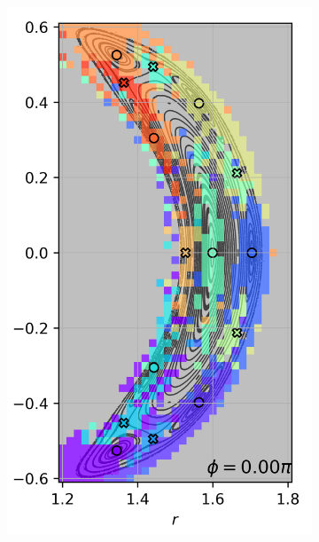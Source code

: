 \begin{figure}
    \centering
    \begin{subfigure}[c]{0.4\textwidth}
        \centering
        \includegraphics[width=\textwidth]{images/fp/convergence_domain_checkonly.png}
        \caption{\label{fig:fp-ncsx}}
    \end{subfigure}
    \hfill
    \begin{subfigure}[c]{0.58\textwidth}
        \centering

\end{subfigure}
\end{figure}
